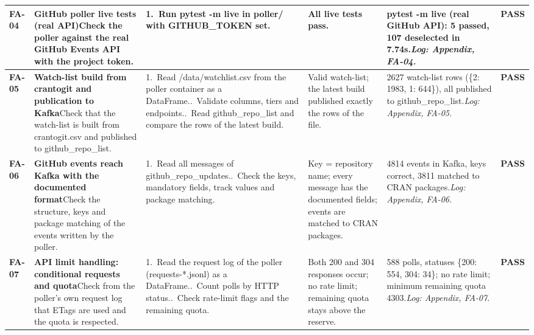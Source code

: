 {\begin{longtable}{@{}L{1.1cm}L{5.8cm}L{5.4cm}L{3.9cm}L{5.5cm}L{1.3cm}@{}}
\midrule[0.3pt]
\textbf{FA-04} & \textbf{GitHub poller live tests (real API)}\newline Check the poller against the real GitHub Events API with the project token. & 1.~Run pytest -m live in poller/\allowbreak{} with GITHUB\_\allowbreak{}TOKEN set. & All live tests pass. & pytest -m live (real GitHub API): 5 passed, 107 deselected in 7.74s.\newline \textit{Log: Appendix, FA-04.} & \textbf{\textcolor{green!45!black}{PASS}} \\
\midrule[0.3pt]
\textbf{FA-05} & \textbf{Watch-list build from crantogit and publication to Kafka}\newline Check that the watch-list is built from crantogit.csv and published to github\_\allowbreak{}repo\_\allowbreak{}list. & 1.~Read /\allowbreak{}data/\allowbreak{}watchlist.csv from the poller container as a DataFrame..~Validate columns, tiers and endpoints..~Read github\_\allowbreak{}repo\_\allowbreak{}list and compare the rows of the latest build. & Valid watch-list; the latest build published exactly the rows of the file. & 2627 watch-list rows (\{2: 1983, 1: 644\}), all published to github\_\allowbreak{}repo\_\allowbreak{}list.\newline \textit{Log: Appendix, FA-05.} & \textbf{\textcolor{green!45!black}{PASS}} \\
\midrule[0.3pt]
\textbf{FA-06} & \textbf{GitHub events reach Kafka with the documented format}\newline Check the structure, keys and package matching of the events written by the poller. & 1.~Read all messages of github\_\allowbreak{}repo\_\allowbreak{}updates..~Check the keys, mandatory fields, track values and package matching. & Key = repository name; every message has the documented fields; events are matched to CRAN packages. & 4814 events in Kafka, keys correct, 3811 matched to CRAN packages.\newline \textit{Log: Appendix, FA-06.} & \textbf{\textcolor{green!45!black}{PASS}} \\
\midrule[0.3pt]
\textbf{FA-07} & \textbf{API limit handling: conditional requests and quota}\newline Check from the poller's own request log that ETags are used and the quota is respected. & 1.~Read the request log of the poller (requests-*.jsonl) as a DataFrame..~Count polls by HTTP status..~Check rate-limit flags and the remaining quota. & Both 200 and 304 responses occur; no rate limit; remaining quota stays above the reserve. & 588 polls, statuses \{200: 554, 304: 34\}; no rate limit; minimum remaining quota 4303.\newline \textit{Log: Appendix, FA-07.} & \textbf{\textcolor{green!45!black}{PASS}} \\

\end{longtable}}
